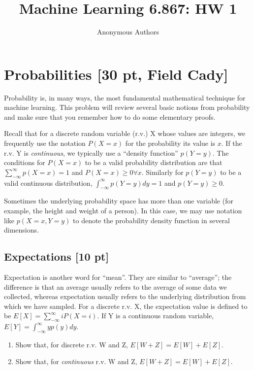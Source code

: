 \documentclass[11pt]{article}
\begin{document}
\title{Machine Learning 6.867: HW 1}
\author{Anonymous Authors}
\maketitle



\section{Probabilities [30 pt, Field Cady]}
Probability is, in many ways, the most fundamental mathematical technique for
machine learning. This problem will review several basic notions from
probability and make sure that you remember how to do some elementary proofs.

Recall that for a discrete random variable (r.v.) X whose values are integers,
we frequently use the notation $P(X=x)$ for the probability its value is $x$. If the r.v. Y is \emph{continuous}, we typically use a ``density function'' $p(Y=y)$. The
conditions for $P(X=x)$ to be a valid probability distribution are that
$\sum_{-\infty}^{\infty}p(X=x)=1$ and $P(X=x) \geq 0 \forall x$. Similarly for $p(Y=y)$ to
be a valid continuous distribution, $\int_{-\infty}^{\infty}p(Y=y)dy=1$ and $p(Y=y)
\geq 0$.

Sometimes the underlying probability space has more than one variable (for
example, the height and weight of a person).  In this case, we may use notation
like $p(X=x,Y=y)$ to denote the probability density function in several
dimensions.

\subsection{Expectations [10 pt]} Expectation is another word for ``mean''.  They are
similar to ``average''; the difference is that an average usually refers to the
average of some data we collected, whereas expectation usually refers to the
underlying distribution from which we have sampled.  For a discrete r.v. X, the
expectation value is defined to be $E[X]=\sum_{-\infty}^{\infty}i P(X=i)$. If Y
is a continuous random variable, $E[Y]=\int_{-\infty}^{\infty}y p(y)dy$.
\begin{enumerate}
\item Show that, for discrete r.v. W and Z, $E[W+Z]=E[W]+E[Z]$.
\item Show that, for \emph{continuous} r.v. W and Z, $E[W+Z]=E[W]+E[Z]$.
\end{enumerate}
\end{document}
